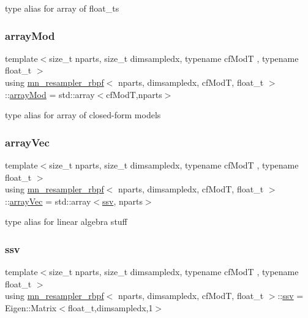 type alias for array of float\+\_\+ts \mbox{\label{classmn__resampler__rbpf_a268fe176a23e146b8f0c1acbaf8625b3}} 
\subsubsection{\texorpdfstring{array\+Mod}{arrayMod}}
{\footnotesize\ttfamily template$<$size\+\_\+t nparts, size\+\_\+t dimsampledx, typename cf\+ModT , typename float\+\_\+t $>$ \\
using \hyperlink{classmn__resampler__rbpf}{mn\+\_\+resampler\+\_\+rbpf}$<$ nparts, dimsampledx, cf\+ModT, float\+\_\+t $>$\+::\hyperlink{classmn__resampler__rbpf_a268fe176a23e146b8f0c1acbaf8625b3}{array\+Mod} =  std\+::array$<$cf\+ModT,nparts$>$}

type alias for array of closed-\/form models \mbox{\label{classmn__resampler__rbpf_a9eddf10f48c19b555276bbd23826044b}} 
\subsubsection{\texorpdfstring{array\+Vec}{arrayVec}}
{\footnotesize\ttfamily template$<$size\+\_\+t nparts, size\+\_\+t dimsampledx, typename cf\+ModT , typename float\+\_\+t $>$ \\
using \hyperlink{classmn__resampler__rbpf}{mn\+\_\+resampler\+\_\+rbpf}$<$ nparts, dimsampledx, cf\+ModT, float\+\_\+t $>$\+::\hyperlink{classmn__resampler__rbpf_a9eddf10f48c19b555276bbd23826044b}{array\+Vec} =  std\+::array$<$\hyperlink{classmn__resampler__rbpf_aff8bcd12cfe60425c4406262a9640d68}{ssv}, nparts$>$}

type alias for linear algebra stuff \mbox{\label{classmn__resampler__rbpf_aff8bcd12cfe60425c4406262a9640d68}} 
\subsubsection{\texorpdfstring{ssv}{ssv}}
{\footnotesize\ttfamily template$<$size\+\_\+t nparts, size\+\_\+t dimsampledx, typename cf\+ModT , typename float\+\_\+t $>$ \\
using \hyperlink{classmn__resampler__rbpf}{mn\+\_\+resampler\+\_\+rbpf}$<$ nparts, dimsampledx, cf\+ModT, float\+\_\+t $>$\+::\hyperlink{classmn__resampler__rbpf_aff8bcd12cfe60425c4406262a9640d68}{ssv} =  Eigen\+::\+Matrix$<$float\+\_\+t,dimsampledx,1$>$}

